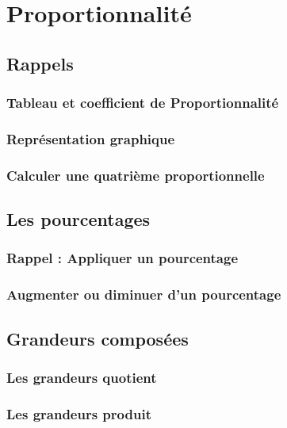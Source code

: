 \documentclass[a4paper]{book}
\begin{document}
\setcounter{chapter}{-1}
\renewcommand{\monTitre}{Proportionnalité}
\chapter{\monTitre}
\thispagestyle{fancy}


\section{Rappels}
\subsection{Tableau et coefficient de Proportionnalité}

\subsection{Représentation graphique}


\subsection{Calculer une quatrième proportionnelle}


\section{Les pourcentages}
\subsection{Rappel : Appliquer un pourcentage}


\subsection{Augmenter ou diminuer d'un pourcentage}



\section{Grandeurs composées}
\subsection{Les grandeurs quotient}


\subsection{Les grandeurs produit}
\end{document}
